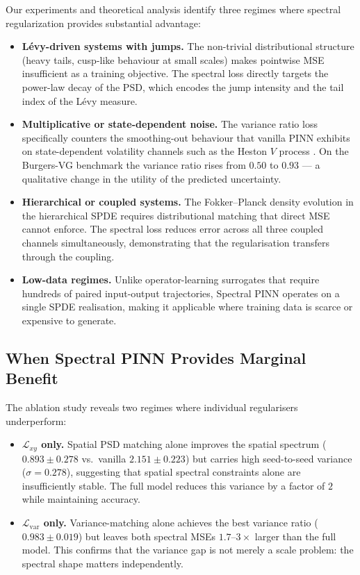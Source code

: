 \documentclass[times,12pt]{elsarticle}
\begin{document}
Our experiments and theoretical analysis identify three regimes where spectral
regularization provides substantial advantage:
\begin{itemize}
    \item \textbf{L\'evy-driven systems with jumps.} The non-trivial distributional
    structure (heavy tails, cusp-like behaviour at small scales) makes pointwise
    MSE insufficient as a training objective. The spectral loss directly targets
    the power-law decay of the PSD, which encodes the jump intensity and the
    tail index of the L\'evy measure.
    \item \textbf{Multiplicative or state-dependent noise.} The variance ratio loss
    specifically counters the smoothing-out behaviour
    that vanilla PINN exhibits on state-dependent volatility channels such as the
    Heston $V$ process \cite{ContTankov2003}. On the Burgers-VG benchmark the
    variance ratio rises from $0.50$ to $0.93$ --- a qualitative change in the
    utility of the predicted uncertainty.
    \item \textbf{Hierarchical or coupled systems.} The Fokker--Planck density
    evolution in the hierarchical SPDE requires distributional matching that
    direct MSE cannot enforce. The spectral loss reduces error across all three
    coupled channels simultaneously, demonstrating that the regularisation
    transfers through the coupling.
    \item \textbf{Low-data regimes.} Unlike operator-learning surrogates that
    require hundreds of paired input-output trajectories, Spectral PINN operates
    on a single SPDE realisation, making it applicable where training data is
    scarce or expensive to generate.
\end{itemize}

\subsection{When Spectral PINN Provides Marginal Benefit}

The ablation study reveals two regimes where individual regularisers underperform:
\begin{itemize}
    \item \textbf{$\mathcal{L}_{xy}$ only.} Spatial PSD matching alone improves the
    spatial spectrum ($0.893 \pm 0.278$ vs.\ vanilla $2.151 \pm 0.223$) but carries
    high seed-to-seed variance ($\sigma=0.278$), suggesting that spatial spectral
    constraints alone are insufficiently stable. The full model reduces this
    variance by a factor of $2$ while maintaining accuracy.
    \item \textbf{$\mathcal{L}_{\mathrm{var}}$ only.} Variance-matching alone achieves
    the best variance ratio ($0.983 \pm 0.019$) but leaves both spectral MSEs
    $1.7$--$3\times$ larger than the full model. This confirms that the variance
    gap is not merely a scale problem: the spectral shape matters independently.
\end{itemize}
\end{document}
